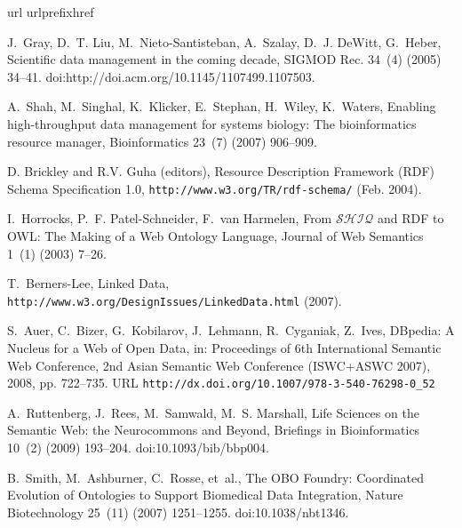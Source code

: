 \documentclass{elsarticle}
\begin{document}

\newcommand{\gobble}[1]{}
\begin{thebibliography}{10}
\expandafter\ifx\csname url\endcsname\relax
  \def\url#1{\texttt{#1}}\fi
\expandafter\ifx\csname urlprefix\endcsname\relax\def\urlprefix{URL
}\fi \expandafter\ifx\csname href\endcsname\relax
  \def\href#1#2{#2} \def\path#1{#1}\fi

J.~Gray, D.~T. Liu, M.~Nieto-Santisteban, A.~Szalay, D.~J. DeWitt,
G.~Heber,
  Scientific data management in the coming decade, SIGMOD Rec. 34~(4) (2005)
  34--41.
\newblock \href {http://dx.doi.org/http://doi.acm.org/10.1145/1107499.1107503}
  {\path{doi:http://doi.acm.org/10.1145/1107499.1107503}}.

A.~Shah, M.~Singhal, K.~Klicker, E.~Stephan, H.~Wiley, K.~Waters,
Enabling
  high-throughput data management for systems biology: The bioinformatics
  resource manager, Bioinformatics 23~(7) (2007) 906--909.

{D. Brickley and R.V. Guha (editors)}, {Resource Description
Framework (RDF)
  Schema Specification 1.0}, \url {http://www.w3.org/TR/rdf-schema/} (Feb.
  2004).

I.~Horrocks, P.~F. Patel-Schneider, F.~van Harmelen, {From
$\mathcal{SHIQ}$ and
  {RDF} to {OWL}: The Making of a Web Ontology Language}, Journal of Web
  Semantics 1~(1) (2003) 7--26.

T.~Berners-Lee, {Linked Data},
  \url{http://www.w3.org/DesignIssues/LinkedData.html} (2007).

S.~Auer, C.~Bizer, G.~Kobilarov, J.~Lehmann, R.~Cyganiak, Z.~Ives,
  \href{http://dx.doi.org/10.1007/978-3-540-76298-0_52}{{DBpedia: A Nucleus for
  a Web of Open Data}}, in: Proceedings of 6th International Semantic Web
  Conference, 2nd Asian Semantic Web Conference (ISWC+ASWC 2007), 2008, pp.
  722--735.
\newline\urlprefix\url{http://dx.doi.org/10.1007/978-3-540-76298-0_52}

A.~Ruttenberg, J.~Rees, M.~Samwald, M.~S. Marshall, {Life Sciences
on the
  Semantic Web: the Neurocommons and Beyond}, Briefings in Bioinformatics
  10~(2) (2009) 193--204.
\newblock \href {http://dx.doi.org/10.1093/bib/bbp004}
  {\path{doi:10.1093/bib/bbp004}}.

B.~Smith, M.~Ashburner, C.~Rosse, et~al., {The OBO Foundry:
Coordinated
  Evolution of Ontologies to Support Biomedical Data Integration}, Nature
  Biotechnology 25~(11) (2007) 1251--1255.
\newblock \href {http://dx.doi.org/10.1038/nbt1346}
  {\path{doi:10.1038/nbt1346}}.


\end{thebibliography}
\end{document}
